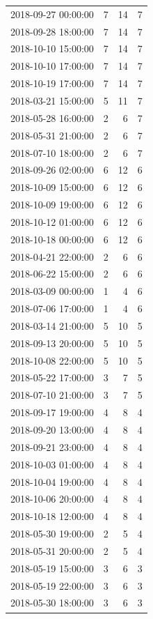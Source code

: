 \begin{tabular}{lrrr}
2018-09-27 00:00:00 & 7 & 14 & 7 \\
2018-09-28 18:00:00 & 7 & 14 & 7 \\
2018-10-10 15:00:00 & 7 & 14 & 7 \\
2018-10-10 17:00:00 & 7 & 14 & 7 \\
2018-10-19 17:00:00 & 7 & 14 & 7 \\
2018-03-21 15:00:00 & 5 & 11 & 7 \\
2018-05-28 16:00:00 & 2 & 6 & 7 \\
2018-05-31 21:00:00 & 2 & 6 & 7 \\
2018-07-10 18:00:00 & 2 & 6 & 7 \\
2018-09-26 02:00:00 & 6 & 12 & 6 \\
2018-10-09 15:00:00 & 6 & 12 & 6 \\
2018-10-09 19:00:00 & 6 & 12 & 6 \\
2018-10-12 01:00:00 & 6 & 12 & 6 \\
2018-10-18 00:00:00 & 6 & 12 & 6 \\
2018-04-21 22:00:00 & 2 & 6 & 6 \\
2018-06-22 15:00:00 & 2 & 6 & 6 \\
2018-03-09 00:00:00 & 1 & 4 & 6 \\
2018-07-06 17:00:00 & 1 & 4 & 6 \\
2018-03-14 21:00:00 & 5 & 10 & 5 \\
2018-09-13 20:00:00 & 5 & 10 & 5 \\
2018-10-08 22:00:00 & 5 & 10 & 5 \\
2018-05-22 17:00:00 & 3 & 7 & 5 \\
2018-07-10 21:00:00 & 3 & 7 & 5 \\
2018-09-17 19:00:00 & 4 & 8 & 4 \\
2018-09-20 13:00:00 & 4 & 8 & 4 \\
2018-09-21 23:00:00 & 4 & 8 & 4 \\
2018-10-03 01:00:00 & 4 & 8 & 4 \\
2018-10-04 19:00:00 & 4 & 8 & 4 \\
2018-10-06 20:00:00 & 4 & 8 & 4 \\
2018-10-18 12:00:00 & 4 & 8 & 4 \\
2018-05-30 19:00:00 & 2 & 5 & 4 \\
2018-05-31 20:00:00 & 2 & 5 & 4 \\
2018-05-19 15:00:00 & 3 & 6 & 3 \\
2018-05-19 22:00:00 & 3 & 6 & 3 \\
2018-05-30 18:00:00 & 3 & 6 & 3 \\

\end{tabular}
